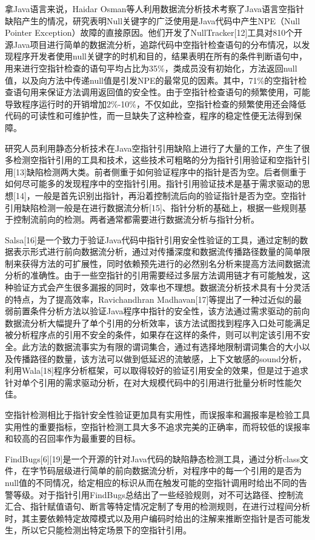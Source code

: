 拿Java语言来说，Haidar Osman等人利用数据流分析技术考察了Java语言空指针缺陷产生的情况，研究表明Null关键字的广泛使用是Java代码中产生NPE（Null Pointer Exception）故障的直接原因。他们开发了NullTracker[12]工具对810个开源Java项目进行简单的数据流分析，追踪代码中空指针检查语句的分布情况，以发现程序开发者使用null关键字的时机和目的，结果表明在所有的条件判断语句中，用来进行空指针检查的语句平均占比为35\%，类成员没有初始化，方法返回null值，以及向方法中传递null值是引发NPE的最常见的因素。其中，71\%的空指针检查语句用来保证方法调用返回值的安全性。由于空指针检查语句的频繁使用，可能导致程序运行时的开销增加2\%-10\%，不仅如此，空指针检查的频繁使用还会降低代码的可读性和可维护性，而一旦缺失了这种检查，程序的稳定性便无法得到保障。

研究人员利用静态分析技术在Java空指针引用缺陷上进行了大量的工作，产生了很多检测空指针引用的工具和技术，这些技术可粗略的分为指针引用验证和空指针引用[13]缺陷检测两大类。前者侧重于如何验证程序中的指针是否为空。后者侧重于如何尽可能多的发现程序中的空指针引用。指针引用验证技术是基于需求驱动的思想[14]，一般是首先识别出指针，再沿着控制流后向的验证指针是否为空。空指针引用缺陷检测一般是在进行数据流分析[15]、指针分析的基础上，根据一些规则基于控制流前向的检测。两者通常都需要进行数据流分析与指针分析。

Salsa[16]是一个致力于验证Java代码中指针引用安全性验证的工具，通过定制的数据表示形式进行前向数据流分析，通过对传播深度和数据流传播路径数量的简单限制来获得方法的可扩展性，同时依赖预先进行的必然别名分析来提高方法间数据流分析的准确性。由于一些空指针的引用需要经过多层方法调用链才有可能触发，这种验证方式会产生很多漏报的同时，效率也不理想。数据流分析技术具有十分灵活的特点，为了提高效率，Ravichandhran Madhavan[17]等提出了一种过近似的最弱前置条件分析方法以验证Java程序中指针的安全性，该方法通过需求驱动的前向数据流分析大幅提升了单个引用的分析效率，该方法试图找到程序入口处可能满足被分析程序点的引用不安全的条件，如果存在这样的条件，则可以判定该引用不安全。此方法的数据流事实为有限的谓词集合，通过有选择地限制谓词集合的大小以及传播路径的数量，该方法可以做到低延迟的流敏感，上下文敏感的sound分析，利用Wala[18]程序分析框架，可以取得较好的验证引用安全的效果，但是过于追求针对单个引用的需求驱动分析，在对大规模代码中的引用进行批量分析时性能欠佳。

空指针检测相比于指针安全性验证更加具有实用性，而误报率和漏报率是检验工具实用性的重要指标，空指针检测工具大多不追求完美的正确率，而将较低的误报率和较高的召回率作为最重要的目标。

FindBugs[6][19]是一个开源的针对Java代码的缺陷静态检测工具，通过分析class文件，在字节码层级进行简单的前向数据流分析，对程序中的每一个引用的是否为null值的不同情况，给定相应的标识从而在触发可能的空指针调用时给出不同的告警等级。对于指针引用FindBugs总结出了一些经验规则，对不可达路径、控制流汇合、指针赋值语句、断言等特定情况定制了专用的检测规则，在进行过程间分析时，其主要依赖特定故障模式以及用户编码时给出的注解来推断空指针是否可能发生，所以它只能检测出特定场景下的空指针引用。

